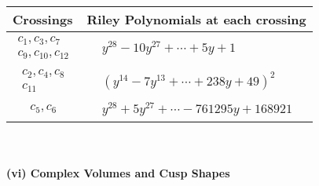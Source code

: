 \documentclass[1p]{elsarticle_modified}
\theoremstyle{definition}
\begin{document}
\begin{tabular}{m{50pt}|m{274pt}}
Crossings & \hspace{64pt}Riley Polynomials at each crossing \\
\hline $$\begin{aligned}c_{1},c_{3},c_{7}\\c_{9},c_{10},c_{12}\end{aligned}$$&$\begin{aligned}
&y^{28}-10 y^{27}+\cdots+5 y+1
\end{aligned}$\\
\hline $$\begin{aligned}c_{2},c_{4},c_{8}\\c_{11}\end{aligned}$$&$\begin{aligned}
&(y^{14}-7 y^{13}+\cdots+238 y+49)^{2}
\end{aligned}$\\
\hline $$\begin{aligned}c_{5},c_{6}\end{aligned}$$&$\begin{aligned}
&y^{28}+5 y^{27}+\cdots-761295 y+168921
\end{aligned}$\\
\hline
\end{tabular}\\~\\
\newpage\flushleft \textbf{(vi) Complex Volumes and Cusp Shapes}
\end{document}
